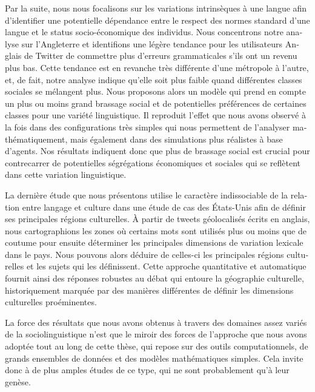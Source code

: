 \documentclass[../thesis.tex]{subfiles}
\begin{document}
\begin{otherlanguage}{french}
Par la suite, nous nous focalisons sur les variations intrinsèques à une langue afin
d'identifier une potentielle dépendance entre le respect des normes standard d'une
langue et le status socio-économique des individus. Nous concentrons notre analyse sur
l'Angleterre et identifions une légère tendance pour les utilisateurs Anglais de Twitter
de commettre plus d'erreurs grammaticales s'ils ont un revenu plus bas. Cette tendance
est en revanche très différente d'une métropole à l'autre, et, de fait, notre analyse
indique qu'elle soit plus faible quand différentes classes sociales se mélangent plus.
Nous proposons alors un modèle qui prend en compte un plus ou moins grand brassage
social et de potentielles préférences de certaines classes pour une variété
linguistique. Il reproduit l'effet que nous avons observé à la fois dans des
configurations très simples qui nous permettent de l'analyser mathématiquement, mais
également dans des simulations plus réalistes à base d'agents. Nos résultats indiquent
donc que plus de brassage social est crucial pour contrecarrer de potentielles
ségrégations économiques et sociales qui se reflètent dans cette variation linguistique.

La dernière étude que nous présentons utilise le caractère indissociable de la relation
entre langage et culture dans une étude de cas des États-Unis afin de définir ses
principales régions culturelles. À partir de tweets géolocalisés écrits en anglais, nous
cartographions les zones où certains mots sont utilisés plus ou moins que de coutume
pour ensuite déterminer les principales dimensions de variation lexicale dans le pays.
Nous pouvons alors déduire de celles-ci les principales régions culturelles et les
sujets qui les définissent. Cette approche quantitative et automatique fournit ainsi des
réponses robustes au débat qui entoure la géographie culturelle, historiquement marquée
par des manières différentes de définir les dimensions culturelles proéminentes.

La force des résultats que nous avons obtenus à travers des domaines assez variés de la
sociolinguistique n'est que le miroir des forces de l'approche que nous avons adoptée
tout au long de cette thèse, qui repose sur des outils computationnels, de grands
ensembles de données et des modèles mathématiques simples. Cela invite donc à de plus
amples études de ce type, qui ne sont probablement qu'à leur genèse.
\end{otherlanguage}


\endgroup

\vfill
\end{document}
